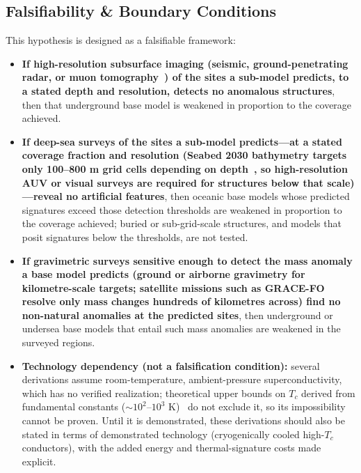 \documentclass[aps,prd,twocolumn,superscriptaddress,nofootinbib]{revtex4-2}
\begin{document}
\subsection{Falsifiability \& Boundary Conditions}\label{sec:falsifiability}

This hypothesis is designed as a falsifiable framework:

\begin{itemize}
  \item \textbf{If high-resolution subsurface imaging (seismic, ground-penetrating radar, or muon tomography~\cite{Alvarez1970}) of the sites a sub-model predicts, to a stated depth and resolution, detects no anomalous structures}, then that underground base model is weakened in proportion to the coverage achieved.
  \item \textbf{If deep-sea surveys of the sites a sub-model predicts---at a stated coverage fraction and resolution (Seabed 2030 bathymetry targets only 100--800 m grid cells depending on depth~\cite{Mayer2018}, so high-resolution AUV or visual surveys are required for structures below that scale)---reveal no artificial features}, then oceanic base models whose predicted signatures exceed those detection thresholds are weakened in proportion to the coverage achieved; buried or sub-grid-scale structures, and models that posit signatures below the thresholds, are not tested.
  \item \textbf{If gravimetric surveys sensitive enough to detect the mass anomaly a base model predicts (ground or airborne gravimetry for kilometre-scale targets; satellite missions such as GRACE-FO~\cite{NASA_GRACEFO} resolve only mass changes hundreds of kilometres across) find no non-natural anomalies at the predicted sites}, then underground or undersea base models that entail such mass anomalies are weakened in the surveyed regions.
  \item \textbf{Technology dependency (not a falsification condition):} several derivations assume room-temperature, ambient-pressure superconductivity, which has no verified realization; theoretical upper bounds on $T_{c}$ derived from fundamental constants (${\sim}10^{2}$--$10^{3}$ K)~\cite{Trachenko2025} do not exclude it, so its impossibility cannot be proven. Until it is demonstrated, these derivations should also be stated in terms of demonstrated technology (cryogenically cooled high-$T_{c}$ conductors), with the added energy and thermal-signature costs made explicit.
\end{itemize}
\end{document}
